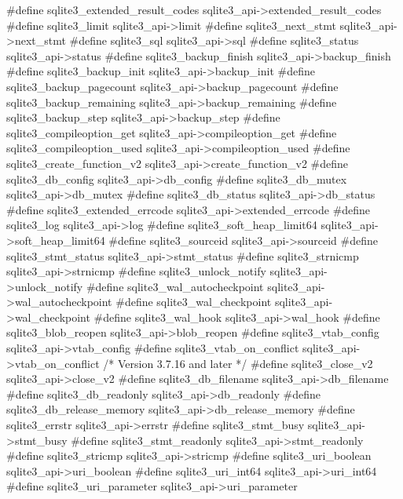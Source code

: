 \begin{Codex}[label=sqlite3ext.h,numbers=left]
#define sqlite3_extended_result_codes  sqlite3_api->extended_result_codes
#define sqlite3_limit                  sqlite3_api->limit
#define sqlite3_next_stmt              sqlite3_api->next_stmt
#define sqlite3_sql                    sqlite3_api->sql
#define sqlite3_status                 sqlite3_api->status
#define sqlite3_backup_finish          sqlite3_api->backup_finish
#define sqlite3_backup_init            sqlite3_api->backup_init
#define sqlite3_backup_pagecount       sqlite3_api->backup_pagecount
#define sqlite3_backup_remaining       sqlite3_api->backup_remaining
#define sqlite3_backup_step            sqlite3_api->backup_step
#define sqlite3_compileoption_get      sqlite3_api->compileoption_get
#define sqlite3_compileoption_used     sqlite3_api->compileoption_used
#define sqlite3_create_function_v2     sqlite3_api->create_function_v2
#define sqlite3_db_config              sqlite3_api->db_config
#define sqlite3_db_mutex               sqlite3_api->db_mutex
#define sqlite3_db_status              sqlite3_api->db_status
#define sqlite3_extended_errcode       sqlite3_api->extended_errcode
#define sqlite3_log                    sqlite3_api->log
#define sqlite3_soft_heap_limit64      sqlite3_api->soft_heap_limit64
#define sqlite3_sourceid               sqlite3_api->sourceid
#define sqlite3_stmt_status            sqlite3_api->stmt_status
#define sqlite3_strnicmp               sqlite3_api->strnicmp
#define sqlite3_unlock_notify          sqlite3_api->unlock_notify
#define sqlite3_wal_autocheckpoint     sqlite3_api->wal_autocheckpoint
#define sqlite3_wal_checkpoint         sqlite3_api->wal_checkpoint
#define sqlite3_wal_hook               sqlite3_api->wal_hook
#define sqlite3_blob_reopen            sqlite3_api->blob_reopen
#define sqlite3_vtab_config            sqlite3_api->vtab_config
#define sqlite3_vtab_on_conflict       sqlite3_api->vtab_on_conflict
/* Version 3.7.16 and later */
#define sqlite3_close_v2               sqlite3_api->close_v2
#define sqlite3_db_filename            sqlite3_api->db_filename
#define sqlite3_db_readonly            sqlite3_api->db_readonly
#define sqlite3_db_release_memory      sqlite3_api->db_release_memory
#define sqlite3_errstr                 sqlite3_api->errstr
#define sqlite3_stmt_busy              sqlite3_api->stmt_busy
#define sqlite3_stmt_readonly          sqlite3_api->stmt_readonly
#define sqlite3_stricmp                sqlite3_api->stricmp
#define sqlite3_uri_boolean            sqlite3_api->uri_boolean
#define sqlite3_uri_int64              sqlite3_api->uri_int64
#define sqlite3_uri_parameter          sqlite3_api->uri_parameter

\end{Codex}
